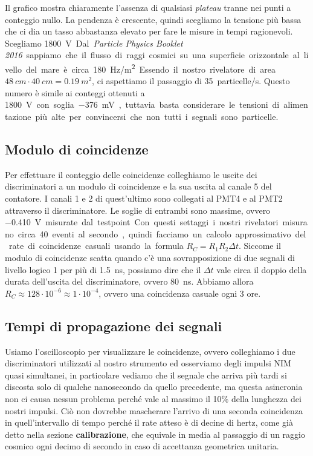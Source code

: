 \documentclass[a4paper]{article}
\begin{document}
Il grafico mostra chiaramente l'assenza di qualsiasi \emph{plateau} tranne nei punti a conteggio nullo.
La pendenza è crescente, quindi scegliamo la tensione più bassa che ci dia un tasso abbastanza elevato
per fare le misure in tempi ragionevoli.
Scegliamo \SI{1800}V.

Dal \emph{Particle Physics Booklet 2016} sappiamo che il flusso di raggi cosmici su una superficie orizzontale al livello del mare è circa \SI{180}{Hz/m^2}.
Essendo il nostro rivelatore di area $\SI{48}{cm}\cdot\SI{40}{cm}=\SI{0.19}{m^2}$,
ci aspettiamo il passaggio di \SI{35}{particelle/s}.
Questo numero è simile ai conteggi ottenuti a \SI{1800}V con soglia \SI{-376}{mV},
tuttavia basta considerare le tensioni di alimentazione più alte per convincersi
che non tutti i segnali sono particelle.

\subsection*{Modulo di coincidenze}

Per effettuare il conteggio delle coincidenze colleghiamo le uscite dei discriminatori a un modulo di coincidenze e la sua uscita al canale 5 del contatore.
I canali 1 e 2 di quest'ultimo sono collegati al PMT4 e al PMT2 attraverso il discriminatore.
Le soglie di entrambi sono massime, ovvero \SI{-0.410}V misurate dal testpoint.
Con questi settaggi i nostri rivelatori misurano circa 40 eventi al secondo,
quindi facciamo un calcolo approssimativo del rate di coincidenze casuali usando la formula
$R_C=R_1R_2\Delta t$.
Siccome il modulo di coincidenze scatta quando c'è una sovrapposizione di due segnali di livello logico 1 per più di \SI{1.5}{ns},
possiamo dire che il $\Delta t$ vale circa il doppio della durata dell'uscita del discriminatore, ovvero \SI{80}{ns}.
Abbiamo allora $R_C\approx 128\cdot10^{-6}\approx1\cdot10^{-4}$,
ovvero una coincidenza casuale ogni 3 ore.

\subsection*{Tempi di propagazione dei segnali}

%

Usiamo l'oscilloscopio per visualizzare le coincidenze, ovvero colleghiamo i due discriminatori utilizzati al nostro strumento ed osserviamo degli impulsi NIM quasi simultanei, in particolare vediamo che il segnale che arriva più tardi si discosta solo di qualche nanosecondo da quello precedente, ma questa asincronia non ci causa nessun problema perché vale al massimo il 10\% della lunghezza dei nostri impulsi.
Ciò non dovrebbe mascherare l'arrivo di una seconda coincidenza in quell'intervallo di tempo perché il rate atteso è di decine di hertz, come già detto nella sezione \textbf{calibrazione}, che equivale in media al passaggio di un raggio cosmico ogni decimo di secondo in caso di accettanza geometrica unitaria.
\end{document}
